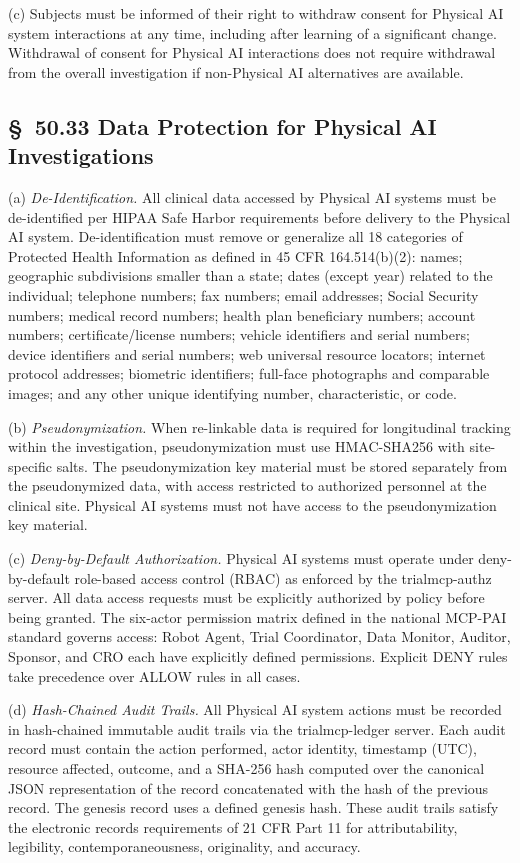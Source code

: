 (c) Subjects must be informed of their right to withdraw consent for Physical AI system interactions at any time, including after learning of a significant change. Withdrawal of consent for Physical AI interactions does not require withdrawal from the overall investigation if non-Physical AI alternatives are available.

\subsection{\S~50.33 Data Protection for Physical AI Investigations}

(a) \textit{De-Identification.} All clinical data accessed by Physical AI systems must be de-identified per HIPAA Safe Harbor requirements before delivery to the Physical AI system. De-identification must remove or generalize all 18 categories of Protected Health Information as defined in 45 CFR 164.514(b)(2): names; geographic subdivisions smaller than a state; dates (except year) related to the individual; telephone numbers; fax numbers; email addresses; Social Security numbers; medical record numbers; health plan beneficiary numbers; account numbers; certificate/license numbers; vehicle identifiers and serial numbers; device identifiers and serial numbers; web universal resource locators; internet protocol addresses; biometric identifiers; full-face photographs and comparable images; and any other unique identifying number, characteristic, or code.

(b) \textit{Pseudonymization.} When re-linkable data is required for longitudinal tracking within the investigation, pseudonymization must use HMAC-SHA256 with site-specific salts. The pseudonymization key material must be stored separately from the pseudonymized data, with access restricted to authorized personnel at the clinical site. Physical AI systems must not have access to the pseudonymization key material.

(c) \textit{Deny-by-Default Authorization.} Physical AI systems must operate under deny-by-default role-based access control (RBAC) as enforced by the trialmcp-authz server. All data access requests must be explicitly authorized by policy before being granted. The six-actor permission matrix defined in the national MCP-PAI standard governs access: Robot Agent, Trial Coordinator, Data Monitor, Auditor, Sponsor, and CRO each have explicitly defined permissions. Explicit DENY rules take precedence over ALLOW rules in all cases.

(d) \textit{Hash-Chained Audit Trails.} All Physical AI system actions must be recorded in hash-chained immutable audit trails via the trialmcp-ledger server. Each audit record must contain the action performed, actor identity, timestamp (UTC), resource affected, outcome, and a SHA-256 hash computed over the canonical JSON representation of the record concatenated with the hash of the previous record. The genesis record uses a defined genesis hash. These audit trails satisfy the electronic records requirements of 21 CFR Part 11 for attributability, legibility, contemporaneousness, originality, and accuracy.

